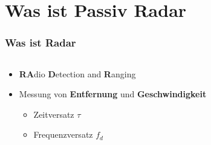 \section{Was ist Passiv Radar}

\begin{frame}
    \frametitle{Was ist Radar}

    \begin{columns}
        \begin{column}{0.6\textwidth}
            \begin{itemize}
                \item \textbf{RA}dio \textbf{D}etection and \textbf{R}anging
                \item Messung von \textbf{Entfernung} und \textbf{Geschwindigkeit}
                      \begin{itemize}
                          \item<3-> Zeitversatz \(\tau\)
                          \item<3-> Frequenzversatz \(f_{d}\)
                      \end{itemize}
            \end{itemize}
        \end{column}
        \begin{column}{0.4\textwidth}
            \begin{figure}
                \centering
                \begin{tikzpicture}
                    
                \end{tikzpicture}
            \end{figure}
        \end{column}
    \end{columns}
\end{frame}

